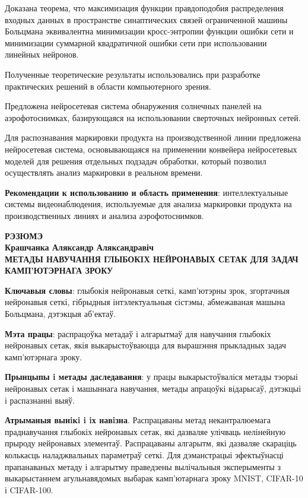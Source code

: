 \documentclass{thesisby}
\begin{document}
Доказана теорема, что максимизация функции правдоподобия распределения входных данных в пространстве синаптических связей ограниченной машины Больцмана эквивалентна минимизации кросс-энтропии функции ошибки сети и минимизации суммарной квадратичной ошибки сети при использовании линейных нейронов.

Полученные теоретические результаты использовались при разработке практических решений в области компьютерного зрения.

Предложена нейросетевая система обнаружения солнечных панелей на аэрофотоснимках, базирующаяся на использовании сверточных нейронных сетей.

Для распознавания маркировки продукта на производственной линии предложена нейросетевая система, основывающаяся на применении конвейера нейросетевых моделей для решения отдельных подзадач обработки, который позволил осуществлять анализ маркировки в реальном времени.

\textbf{Рекомендации к использованию и область применения}:
интеллектуальные системы видеонаблюдения, используемые для анализа маркировки продукта на производственных линиях и анализа аэрофотоснимков.

\newpage
\begin{center}
\bf РЭЗЮМЭ\\[1mm]\rm Крашчанка Аляксандр Аляксандравіч\\[1mm] \bf МЕТАДЫ НАВУЧАННЯ ГЛЫБОКIХ НЕЙРОНАВЫХ СЕТАК ДЛЯ ЗАДАЧ КАМП'ЮТЭРНАГА ЗРОКУ
\end{center}

{\bf Ключавыя словы}: глыбокія нейронавыя сеткі, камп'ютэрны зрок, згортачныя нейронавыя сеткі, гібрыдныя інтэлектуальныя сістэмы, абмежаваная машына Больцмана, дэтэкцыя аб'екта\u{у}.

\textbf{Мэта працы}: распрацо\u{у}ка метада\u{у} і алгарытма\u{у} для навучання глыбокіх нейронавых сетак, якія выкарысто\u{у}ваюцца для вырашэння прыкладных задач камп'ютэрнага зроку.

\textbf{Прынцыпы i метады даследавання}: у працы выкарысто\u{у}валіся метады тэорыі нейронавых сетак і машыннага навучання, метады апрацо\u{у}кі відарыса\u{у}, дэтэкцыі і распазнанні выя\u{у}.

\textbf{Атрыманыя вынiкi i iх навiзна}.
Распрацаваны метад некантралюемага праднавучання глыбокіх нейронавых сетак, які дазваляе улічваць нелінейную прыроду нейронавых элемента\u{у}. Распрацаваны алгарытм, які дазваляе скараціць колькасць наладжвальных параметра\u{у} сеткі. Для дэманстрацыі эфекты\u{у}насці прапанаваных метаду і алгарытму праведзены вылічальныя эксперыменты з выкарыстаннем агульнавядомых выбарак камп'ютарнага зроку MNIST, CIFAR-10 і CIFAR-100.
\end{document}
